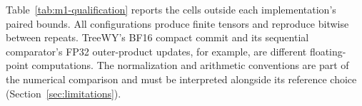Table~\ref{tab:m1-qualification} reports the cells outside each implementation's paired bounds. All configurations produce finite tensors and reproduce bitwise between repeats. TreeWY's BF16 compact commit and its sequential comparator's FP32 outer-product updates, for example, are different floating-point computations. The normalization and arithmetic conventions are part of the numerical comparison and must be interpreted alongside its reference choice (Section~\ref{sec:limitations}).
